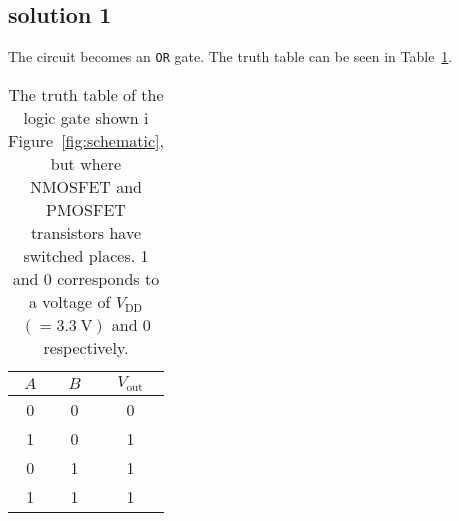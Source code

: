 \documentclass[12pt,a4paper]{article}
\begin{document}
\subsection{solution 1}
The circuit becomes an \texttt{OR} gate.
The truth table can be seen in Table~\ref{tab:logicp1}.
\begin{table}[!ht]
  \centering
  \caption{The truth table of the logic gate shown i Figure~\ref{fig:schematic}, but where NMOSFET and PMOSFET transistors have switched places. 1 and 0 corresponds to a voltage of $V_{\text{DD}}$ $(=\SI{3.3}{\volt})$ and 0 respectively.}
  \begin{tabular}{|c|c|c|}\hline
    $A$ & $B$ & $V_{\text{out}}$ \\\hline
    0 & 0 & 0 \\\hline
    1 & 0 & 1 \\\hline
    0 & 1 & 1 \\\hline
    1 & 1 & 1 \\\hline
  \end{tabular}
  \label{tab:logicp1}
\end{table}

\end{document}
